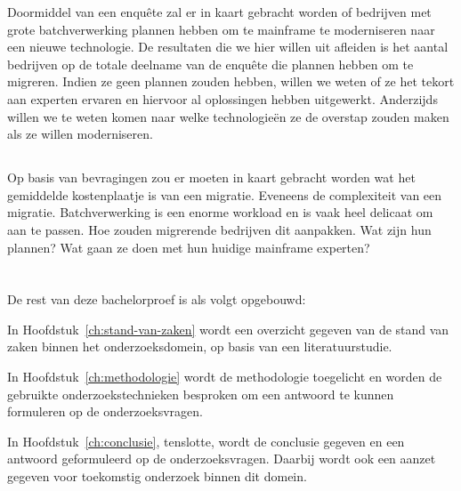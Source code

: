 Doormiddel van een enquête zal er in kaart gebracht worden of bedrijven met grote batchverwerking plannen hebben om te mainframe te moderniseren naar een nieuwe technologie. De resultaten die we hier willen uit afleiden is het aantal bedrijven op de totale deelname van de enquête die plannen hebben om te migreren. Indien ze geen plannen zouden hebben, willen we weten of ze het tekort aan experten ervaren en hiervoor al oplossingen hebben uitgewerkt. Anderzijds willen we te weten komen naar welke technologieën ze de overstap zouden maken als ze willen moderniseren. 

\subsection{}

Op basis van bevragingen zou er moeten in kaart gebracht worden wat het gemiddelde kostenplaatje is van een migratie. Eveneens de complexiteit van een migratie. Batchverwerking is een enorme workload en is vaak heel delicaat om aan te passen. Hoe zouden migrerende bedrijven dit aanpakken. Wat zijn hun plannen? Wat gaan ze doen met hun huidige mainframe experten?

\section{}
\label{sec:opzet-bachelorproef}


De rest van deze bachelorproef is als volgt opgebouwd:

In Hoofdstuk~\ref{ch:stand-van-zaken} wordt een overzicht gegeven van de stand van zaken binnen het onderzoeksdomein, op basis van een literatuurstudie.

In Hoofdstuk~\ref{ch:methodologie} wordt de methodologie toegelicht en worden de gebruikte onderzoekstechnieken besproken om een antwoord te kunnen formuleren op de onderzoeksvragen.


In Hoofdstuk~\ref{ch:conclusie}, tenslotte, wordt de conclusie gegeven en een antwoord geformuleerd op de onderzoeksvragen. Daarbij wordt ook een aanzet gegeven voor toekomstig onderzoek binnen dit domein.